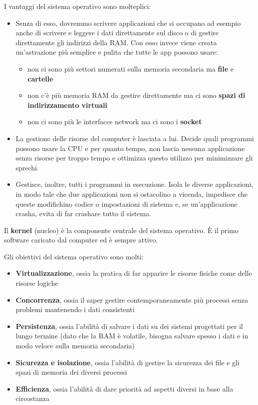 \documentclass[11pt, a4paper, titlepage, oneside]{scrbook}
\begin{document}
I vantaggi del sistema operativo sono molteplici:
\begin{itemize}
    \item Senza di esso, dovremmo scrivere applicazioni che si occupano ad esempio anche di scrivere e leggere i dati direttamente sul disco o di gestire direttamente gli indirizzi della RAM. Con esso invece viene creata un'astrazione più semplice e pulita che tutte le app possono usare: 
\begin{itemize}
    \item non ci sono più settori numerati sulla memoria secondaria ma \textbf{file} e \textbf{cartelle}
    \item non c'è più memoria RAM da gestire direttamente ma ci sono \textbf{spazi di indirizzamento virtuali}
    \item non ci sono più le interfacce network ma ci sono i \textbf{socket}
\end{itemize} 
    \item La gestione delle risorse del computer è lasciata a lui. Decide quali programmi possono usare la CPU e per quanto tempo, non lascia nessuna applicazione senza risorse per troppo tempo e ottimizza questo utilizzo per minimizzare gli sprechi.
    \item Gestisce, inoltre, tutti i programmi in esecuzione. Isola le diverse applicazioni, in modo tale che due applicazioni non si ostacolino a vicenda, impedisce che queste modifichino codice o impostazioni di sistema e, se un'applicazione crasha, evita di far crashare tutto il sistema. 
\end{itemize}

\begin{Definizione}[Kernel]
\label{def-kernel}
Il \textbf{kernel} (nucleo) è la componente centrale del sistema operativo. È il primo software caricato dal computer ed è sempre attivo.
\end{Definizione}

\begin{Proprieta}
\label{prop-obiettivi-sistema-operativo}
Gli obiettivi del sistema operativo sono molti:
\begin{itemize}
    \item \textbf{Virtualizzazione}, ossia la pratica di far apparire le risorse fisiche come delle risorse logiche
    \item \textbf{Concorrenza}, ossia il saper gestire contemporaneamente più processi senza problemi mantenendo i dati consistenti
    \item \textbf{Persistenza}, ossia l'abilità di salvare i dati su dei sistemi progettati per il lungo termine (dato che la RAM è volatile, bisogna salvare spesso i dati e in modo veloce sulla memoria secondaria)
    \item \textbf{Sicurezza e isolazione}, ossia l'abilità di gestire la sicurezza dei file e gli spazi di memoria dei diversi processi
    \item \textbf{Efficienza}, ossia l'abilità di dare priorità ad aspetti diversi in base alla circostanza
\end{itemize}
\end{Proprieta}
\end{document}
